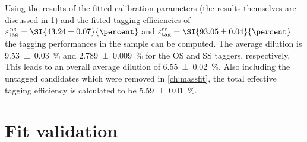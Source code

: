 Using the results of the fitted calibration parameters (the results themselves are discussed in \cref{sec:decTimeFitVal}) and the fitted tagging efficiencies of $\varepsilon_{\text{tag}}^{\text{\tiny OS}}=\SI{43.24\pm0.07}{\percent}$ and $\varepsilon_{\text{tag}}^{\text{\tiny SS}}=\SI{93.05\pm0.04}{\percent}$ the tagging performances in the sample can be computed.
The average dilution is \SI{9.53\pm0.03}{\percent} and \SI{2.789\pm0.009}{\percent} for the OS and SS taggers, respectively.
This leads to an overall average dilution of \SI{6.55\pm0.02}{\percent}.
Also including the untagged candidates which were removed in \cref{ch:massfit}, the total effective tagging efficiency is calculated to be \SI{5.59\pm0.01}{\percent}.

\section{Fit validation}
\label{sec:decTimeFitVal}

